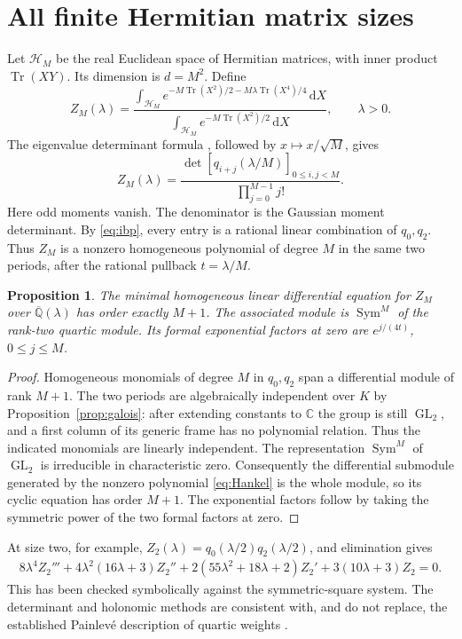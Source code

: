 \documentclass[11pt]{article}
\newtheorem{proposition}[theorem]{Proposition}
\theoremstyle{definition}
\newcommand{\Q}{\mathbb Q}
\newcommand{\C}{\mathbb C}
\newcommand{\GL}{\operatorname{GL}}
\newcommand{\Sym}{\operatorname{Sym}}
\newcommand{\Tr}{\operatorname{Tr}}
\newcommand{\dd}{\,\mathrm d}
\numberwithin{equation}{section}
\begin{document}
\section{All finite Hermitian matrix sizes}\label{sec:matrix}
Let $\mathcal H_M$ be the real Euclidean space of Hermitian matrices,
with inner product $\Tr(XY)$. Its dimension is $d=M^2$. Define
\begin{equation}\label{eq:matrix}
 Z_M(\lambda)=
 \frac{\int_{\mathcal H_M}e^{-M\Tr(X^2)/2-M\lambda\Tr(X^4)/4}\dd X}
 {\int_{\mathcal H_M}e^{-M\Tr(X^2)/2}\dd X},\qquad\lambda>0.
\end{equation}
The eigenvalue determinant formula \cite[Section 5.1]{EKR}, followed by
$x\mapsto x/\sqrt M$, gives
\begin{equation}\label{eq:Hankel}
 Z_M(\lambda)=\frac{\det[q_{i+j}(\lambda/M)]_{0\le i,j<M}}
 {\prod_{j=0}^{M-1}j!}.
\end{equation}
Here odd moments vanish. The denominator is the Gaussian moment
determinant. By \eqref{eq:ibp}, every entry is a rational linear
combination of $q_0,q_2$. Thus $Z_M$ is a nonzero homogeneous polynomial
of degree $M$ in the same two periods, after the rational pullback
$t=\lambda/M$.

\begin{proposition}\label{prop:minimalODE}
The minimal homogeneous linear differential equation for $Z_M$ over
$\overline{\Q}(\lambda)$ has order exactly $M+1$.
The associated module is $\Sym^M$ of the rank-two quartic module.
Its formal exponential factors at zero are
$e^{j/(4t)}$, $0\le j\le M$.
\end{proposition}
\begin{proof}
Homogeneous monomials of degree $M$ in $q_0,q_2$ span a differential
module of rank $M+1$. The two periods are algebraically independent
over $K$ by Proposition~\ref{prop:galois}: after extending constants to
$\C$ the group is still $\GL_2$, and a first column of its generic
frame has no polynomial relation. Thus the indicated monomials
are linearly independent. The representation $\Sym^M$ of $\GL_2$ is
irreducible in characteristic zero. Consequently the differential
submodule generated by the nonzero polynomial \eqref{eq:Hankel} is the
whole module, so its cyclic equation has order $M+1$. The exponential
factors follow by taking the symmetric power of the two formal factors
at zero.
\end{proof}

At size two, for example, $Z_2(\lambda)=q_0(\lambda/2)q_2(\lambda/2)$,
and elimination gives
\begin{equation}\label{eq:M2ODE}
 \begin{split}
 8\lambda^4 Z_2'''+4\lambda^2(16\lambda+3)Z_2''
 +2(55\lambda^2+18\lambda+2)Z_2'
 +3(10\lambda+3)Z_2=0.
 \end{split}
\end{equation}
This has been checked symbolically against the symmetric-square system.
The determinant and holonomic methods are consistent with, and do not
replace, the established Painlev\'e description of quartic weights
\cite{ClarksonJordaan}.
\end{document}
